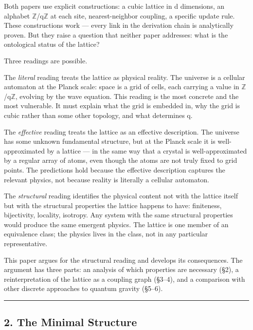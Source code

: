 \documentclass[
  11pt,
]{article}
\begin{document}
Both papers use explicit constructions: a cubic lattice in d dimensions,
an alphabet \ensuremath{\mathbb{Z}}/q\ensuremath{\mathbb{Z}} at each site, nearest-neighbor coupling, a specific
update rule. These constructions work --- every link in the derivation
chain is analytically proven. But they raise a question that neither
paper addresses: what is the ontological status of the lattice?

Three readings are possible.

The \emph{literal} reading treats the lattice as physical reality. The
universe is a cellular automaton at the Planck scale: space is a grid of
cells, each carrying a value in \ensuremath{\mathbb{Z}}/q\ensuremath{\mathbb{Z}}, evolving by the wave equation.
This reading is the most concrete and the most vulnerable. It must
explain what the grid is embedded in, why the grid is cubic rather than
some other topology, and what determines q.

The \emph{effective} reading treats the lattice as an effective
description. The universe has some unknown fundamental structure, but at
the Planck scale it is well-approximated by a lattice --- in the same
way that a crystal is well-approximated by a regular array of atoms,
even though the atoms are not truly fixed to grid points. The
predictions hold because the effective description captures the relevant
physics, not because reality is literally a cellular automaton.

The \emph{structural} reading identifies the physical content not with
the lattice itself but with the structural properties the lattice
happens to have: finiteness, bijectivity, locality, isotropy. Any system
with the same structural properties would produce the same emergent
physics. The lattice is one member of an equivalence class; the physics
lives in the class, not in any particular representative.

This paper argues for the structural reading and develops its
consequences. The argument has three parts: an analysis of which
properties are necessary (§2), a reinterpretation of the lattice as a
coupling graph (§3--4), and a comparison with other discrete approaches
to quantum gravity (§5--6).

\begin{center}\rule{0.5\linewidth}{0.5pt}\end{center}

\hypertarget{the-minimal-structure}{%
\subsection{2. The Minimal Structure}\label{the-minimal-structure}}
\end{document}
